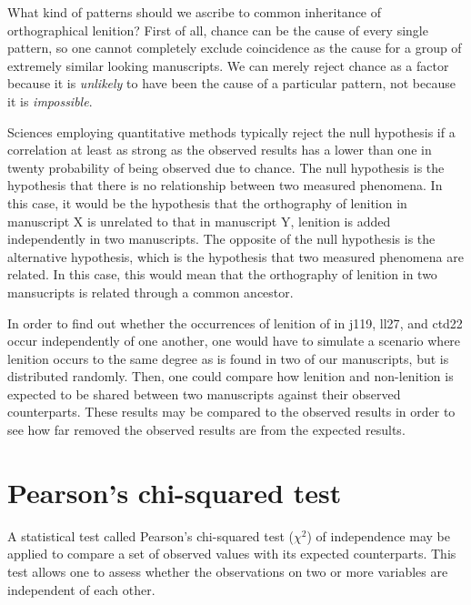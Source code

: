What kind of patterns should we ascribe to common inheritance of orthographical lenition? First of all, chance can be the cause of every single pattern, so one cannot completely exclude coincidence as the cause for a group of extremely similar looking manuscripts. We can merely reject chance as a factor because it is \emph{unlikely} to have been the cause of a particular pattern, not because it is \emph{impossible}.

Sciences employing quantitative methods typically reject the null hypothesis if a correlation at least as strong as the observed results has a lower than one in twenty probability of being observed due to chance.  The null hypothesis is the hypothesis that there is no relationship between two measured phenomena. In this case, it would be the hypothesis that the orthography of lenition in manuscript X is unrelated to that in manuscript Y, \ie lenition is added independently in two manuscripts. The opposite of the null hypothesis is the alternative hypothesis, which is the hypothesis that two measured phenomena are related. In this case, this would mean that the orthography of lenition in two mansucripts is related through a common ancestor.


In order to find out whether the occurrences of lenition of  in \gls{j119}, \gls{ll27}, and \gls{ctd22} occur independently of one another, one would have to simulate a scenario where lenition occurs to the same degree as is found in two of our manuscripts, but is distributed randomly. Then, one could compare how lenition and non-lenition is expected to be shared between two manuscripts against their observed counterparts. These results may  be compared to the observed results in order to see how far removed the observed results are from the expected results.

\section{Pearson's chi-squared test }
\label{sec:pearsons-chi-squared}


A statistical test called Pearson's chi-squared test (\(\chi^2\)) of independence may be applied to compare a set of observed values with its expected counterparts. This test allows one to assess whether the  observations on two or more variables are independent of each other.

